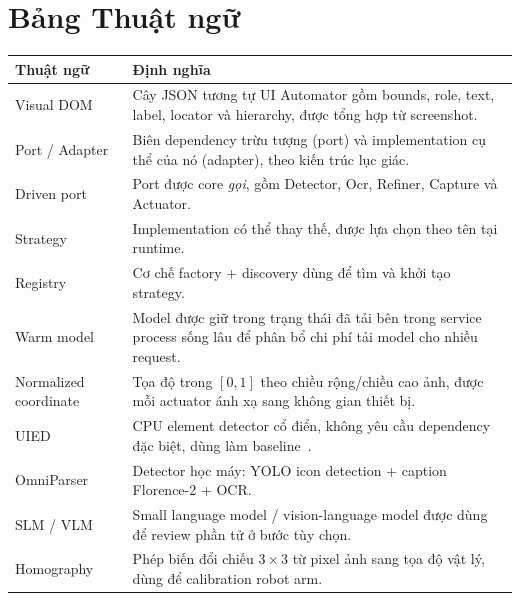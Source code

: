 \documentclass[11pt,a4paper]{report}
\begin{document}
\chapter{Bảng Thuật ngữ}
\begin{longtable}{@{}p{3.8cm}p{10.8cm}@{}}
\toprule
\textbf{Thuật ngữ} & \textbf{Định nghĩa} \\
\midrule
\endhead
Visual DOM & Cây JSON tương tự UI Automator gồm bounds, role, text, label, locator và hierarchy, được tổng hợp từ screenshot. \\
Port / Adapter & Biên dependency trừu tượng (port) và implementation cụ thể của nó (adapter), theo kiến trúc lục giác. \\
Driven port & Port được core \emph{gọi}, gồm Detector, Ocr, Refiner, Capture và Actuator. \\
Strategy & Implementation có thể thay thế, được lựa chọn theo tên tại runtime. \\
Registry & Cơ chế factory + discovery dùng để tìm và khởi tạo strategy. \\
Warm model & Model được giữ trong trạng thái đã tải bên trong service process sống lâu để phân bổ chi phí tải model cho nhiều request. \\
Normalized coordinate & Tọa độ trong $[0,1]$ theo chiều rộng/chiều cao ảnh, được mỗi actuator ánh xạ sang không gian thiết bị. \\
UIED & CPU element detector cổ điển, không yêu cầu dependency đặc biệt, dùng làm baseline~\cite{xie2020uied}. \\
OmniParser & Detector học máy: YOLO icon detection + caption Florence-2 + OCR. \\
SLM / VLM & Small language model / vision-language model được dùng để review phần tử ở bước tùy chọn. \\
Homography & Phép biến đổi chiếu $3\times3$ từ pixel ảnh sang tọa độ vật lý, dùng để calibration robot arm. \\
\bottomrule
\end{longtable}



\end{document}
